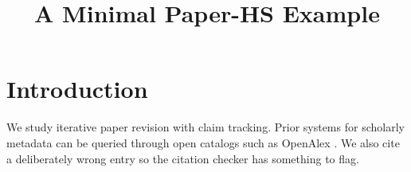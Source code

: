 \documentclass{article}
\begin{document}
\title{A Minimal Paper-HS Example}
\maketitle

\section{Introduction}
We study iterative paper revision with claim tracking. Prior systems for scholarly metadata can be queried through open catalogs such as OpenAlex \cite{priem2022openalex}. We also cite a deliberately wrong entry \cite{wrong2020metadata} so the citation checker has something to flag.



\end{document}
